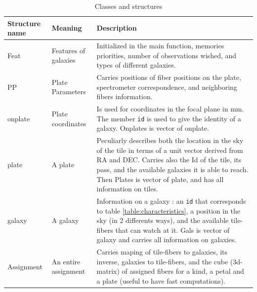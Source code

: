 \documentclass{extarticle}
\begin{document}
\begin{table}[H]\begin{center}
	\begin{tabular}{|l|l|p{12cm}|} \hline
		Structure name & Meaning & Description \\ \hline \hline

		Feat & Features of galaxies & Initialized in the main function, memories priorities, number of observations wished, and types of different galaxies.\\ \hline

		PP & Plate Parameters & Carries positions of fiber positions on the plate, spectrometer correspondence, and neighboring fibers information.\\ 

		onplate & Plate coordinates & Is used for coordinates in the focal plane in mm. The member {\tt id} is used to give the identity of a galaxy. Onplates is vector of onplate.\\ 

		plate & A plate & Peculiarly describes both the location in the sky of the tile in terms of a unit vector derived from RA and DEC. Carries also the Id of the tile, its pass, and the available galaxies it is able to reach. Then Plates is vector of plate, and has all information on tiles.\\ \hline

		galaxy & A galaxy & Information on a galaxy : an {\tt id} that corresponds to table \ref{table:characteristics}, a position in the sky (in 2 differents ways), and the available tile-fibers that can watch at it. Gals is vector of galaxy and carries all information on galaxies.\\ \hline

		Assignment & An entire assignment & Carries maping of tile-fibers to galaxies, its inverse, galaxies to tile-fibers, and the cube (3d-matrix) of assigned fibers for a kind, a petal and a plate (useful to have fast computations).\\ \hline
	\end{tabular}\end{center}
	\caption{Classes and structures}\label{tab:structures}
\end{table}
\end{document}
